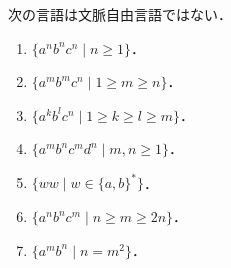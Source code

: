 \documentclass[uplatex, dvipdfmx]{jsreport}
\begin{document}
\begin{corollary}\label{cor-counterexamples-of-CFL}
    次の言語は文脈自由言語ではない．
    \begin{enumerate}
        \item $\{a^nb^nc^n\mid n\ge 1\}$．
        \item $\{a^mb^mc^n\mid 1\ge m\ge n\}$．
        \item $\{a^kb^lc^n\mid 1\ge k\ge l\ge m\}$．
        \item $\{a^mb^nc^md^n\mid m,n\ge 1\}$．
        \item $\{ww\mid w\in\{a,b\}^*\}$．
        \item $\{a^nb^nc^m\mid n\ge m\ge 2n\}$．
        \item $\{a^mb^n\mid n=m^2\}$．
    \end{enumerate}
\end{corollary}
\end{document}
